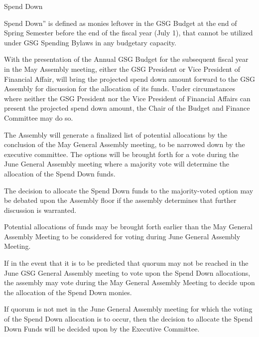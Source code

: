 \begin{bylaws-number}
  \item Spend Down
  \begin{bylaws-number}
    \item Spend Down” is defined as monies leftover in the GSG Budget at the end of Spring Semester before the end of the fiscal year (July 1), that cannot be utilized under GSG Spending Bylaws in any budgetary capacity.
    \item With the presentation of the Annual GSG Budget for the subsequent fiscal year in the May Assembly meeting, either the GSG President or Vice President of Financial Affair, will bring the projected spend down amount forward to the GSG Assembly for discussion for the allocation of its funds. Under circumstances where neither the GSG President nor the Vice President of Financial Affairs can present the projected spend down amount, the Chair of the Budget and Finance Committee may do so.
    \item The Assembly will generate a finalized list of potential allocations by the conclusion of the May General Assembly meeting, to be narrowed down by the executive committee. The options will be brought forth for a vote during the June General Assembly meeting where a majority vote will determine the allocation of the Spend Down funds.
    \item The decision to allocate the Spend Down funds to the majority-voted option may be debated upon the Assembly floor if the assembly determines that further discussion is warranted.
    \item Potential allocations of funds may be brought forth earlier than the May General Assembly Meeting to be considered for voting during June General Assembly Meeting.
    \item If in the event that it is to be predicted that quorum may not be reached in the June GSG General Assembly meeting to vote upon the Spend Down allocations, the assembly may vote during the May General Assembly Meeting to decide upon the allocation of the Spend Down monies.
    \item If quorum is not met in the June General Assembly meeting for which the voting of the Spend Down allocation is to occur, then the decision to allocate the Spend Down Funds will be decided upon by the Executive Committee.
  \end{bylaws-number}
\end{bylaws-number}

